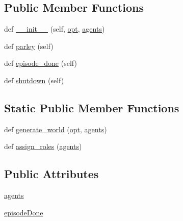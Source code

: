 \subsection*{Public Member Functions}
\begin{DoxyCompactItemize}
\item 
def \hyperlink{classparlai_1_1messenger_1_1tasks_1_1overworld__demo_1_1worlds_1_1MessengerChatTaskWorld_a18bd91724fd4998f675ca02f4de94d6f}{\+\_\+\+\_\+init\+\_\+\+\_\+} (self, \hyperlink{classparlai_1_1core_1_1worlds_1_1World_a3640d92718acd3e6942a28c1ab3678bd}{opt}, \hyperlink{classparlai_1_1messenger_1_1tasks_1_1overworld__demo_1_1worlds_1_1MessengerChatTaskWorld_abe2341e215b3dd74faa43faf03c94ef4}{agents})
\item 
def \hyperlink{classparlai_1_1messenger_1_1tasks_1_1overworld__demo_1_1worlds_1_1MessengerChatTaskWorld_a36caded81c291f01f1d11d0ba3718ee4}{parley} (self)
\item 
def \hyperlink{classparlai_1_1messenger_1_1tasks_1_1overworld__demo_1_1worlds_1_1MessengerChatTaskWorld_a7de5455d9eab677313ea217cc864223d}{episode\+\_\+done} (self)
\item 
def \hyperlink{classparlai_1_1messenger_1_1tasks_1_1overworld__demo_1_1worlds_1_1MessengerChatTaskWorld_ae74306ebc133821d89b295315fbff382}{shutdown} (self)
\end{DoxyCompactItemize}
\subsection*{Static Public Member Functions}
\begin{DoxyCompactItemize}
\item 
def \hyperlink{classparlai_1_1messenger_1_1tasks_1_1overworld__demo_1_1worlds_1_1MessengerChatTaskWorld_adb50954ee0b791a164fbe763de5685d2}{generate\+\_\+world} (\hyperlink{classparlai_1_1core_1_1worlds_1_1World_a3640d92718acd3e6942a28c1ab3678bd}{opt}, \hyperlink{classparlai_1_1messenger_1_1tasks_1_1overworld__demo_1_1worlds_1_1MessengerChatTaskWorld_abe2341e215b3dd74faa43faf03c94ef4}{agents})
\item 
def \hyperlink{classparlai_1_1messenger_1_1tasks_1_1overworld__demo_1_1worlds_1_1MessengerChatTaskWorld_acf71ed2d21619031072be14ef0c78479}{assign\+\_\+roles} (\hyperlink{classparlai_1_1messenger_1_1tasks_1_1overworld__demo_1_1worlds_1_1MessengerChatTaskWorld_abe2341e215b3dd74faa43faf03c94ef4}{agents})
\end{DoxyCompactItemize}
\subsection*{Public Attributes}
\begin{DoxyCompactItemize}
\item 
\hyperlink{classparlai_1_1messenger_1_1tasks_1_1overworld__demo_1_1worlds_1_1MessengerChatTaskWorld_abe2341e215b3dd74faa43faf03c94ef4}{agents}
\item 
\hyperlink{classparlai_1_1messenger_1_1tasks_1_1overworld__demo_1_1worlds_1_1MessengerChatTaskWorld_ac5fcb701fa3c83399f9138db138b6611}{episode\+Done}
\end{DoxyCompactItemize}
